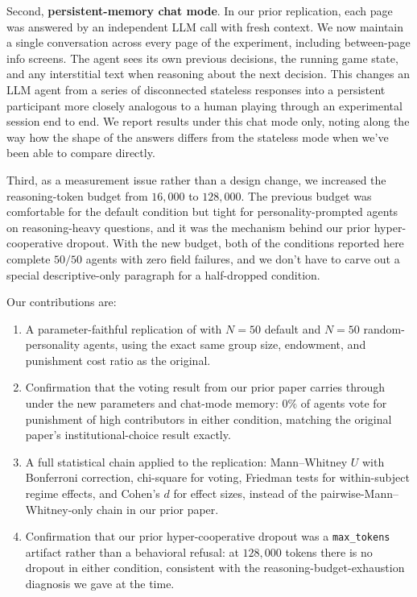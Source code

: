 \documentclass[12pt, a4paper]{article}
\begin{document}
Second, \textbf{persistent-memory chat mode}. In our prior replication, each page was answered by an independent LLM call with fresh context. We now maintain a single conversation across every page of the experiment, including between-page info screens. The agent sees its own previous decisions, the running game state, and any interstitial text when reasoning about the next decision. This changes an LLM agent from a series of disconnected stateless responses into a persistent participant more closely analogous to a human playing through an experimental session end to end. We report results under this chat mode only, noting along the way how the shape of the answers differs from the stateless mode when we've been able to compare directly.

Third, as a measurement issue rather than a design change, we increased the reasoning-token budget from $16{,}000$ to $128{,}000$. The previous budget was comfortable for the default condition but tight for personality-prompted agents on reasoning-heavy questions, and it was the mechanism behind our prior hyper-cooperative dropout. With the new budget, both of the conditions reported here complete $50/50$ agents with zero field failures, and we don't have to carve out a special descriptive-only paragraph for a half-dropped condition.

Our contributions are:
\begin{enumerate}
  \item A parameter-faithful replication of \citet{ertan2009who} with $N=50$ default and $N=50$ random-personality agents, using the exact same group size, endowment, and punishment cost ratio as the original.
  \item Confirmation that the voting result from our prior paper carries through under the new parameters and chat-mode memory: $0\%$ of agents vote for punishment of high contributors in either condition, matching the original paper's institutional-choice result exactly.
  \item A full statistical chain applied to the replication: Mann--Whitney $U$ with Bonferroni correction, chi-square for voting, Friedman tests for within-subject regime effects, and Cohen's $d$ for effect sizes, instead of the pairwise-Mann--Whitney-only chain in our prior paper.
  \item Confirmation that our prior hyper-cooperative dropout was a \texttt{max\_tokens} artifact rather than a behavioral refusal: at $128{,}000$ tokens there is no dropout in either condition, consistent with the reasoning-budget-exhaustion diagnosis we gave at the time.
\end{enumerate}
\end{document}
